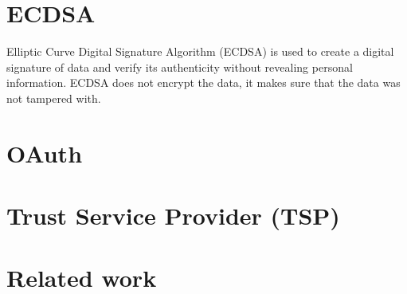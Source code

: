 \newpage

\section{ECDSA}
Elliptic Curve Digital Signature Algorithm (ECDSA) is used to create a digital signature of data and verify its authenticity without revealing personal information. ECDSA does not encrypt the data, it makes sure that the data was not tampered with.
\section{OAuth}
\newpage
\section{Trust Service Provider (TSP)}
\newpage
\section{Related work}
